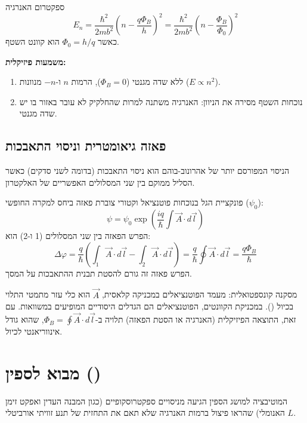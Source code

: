 \begin{resultbox}{ספקטרום האנרגיה}
\begin{equation}
E_n = \frac{\hbar^2}{2m b^2} \left( n - \frac{q\Phi_B}{h} \right)^2 = \frac{\hbar^2}{2m b^2} \left( n - \frac{\Phi_B}{\Phi_0} \right)^2
\end{equation}
כאשר $\Phi_0 = h/q$ הוא קוונט השטף.
\end{resultbox}

\textbf{משמעות פיזיקלית:}
\begin{enumerate}
    \item ללא שדה מגנטי ($\Phi_B=0$), הרמות $n$ ו-$-n$ מנוונות ($E \propto n^2$).
    \item נוכחות השטף מסירה את הניוון: האנרגיה משתנה למרות שהחלקיק לא עובר באזור בו יש שדה מגנטי.
\end{enumerate}

\subsection{פאזה גיאומטרית וניסוי התאבכות}
הניסוי המפורסם יותר של אהרונוב-בוהם הוא ניסוי התאבכות (בדומה לשני סדקים) כאשר הסליל ממוקם בין שני המסלולים האפשריים של האלקטרון.

פונקציית הגל בנוכחות פוטנציאל וקטורי צוברת פאזה ביחס למקרה החופשי ($\psi_0$):
\[
\psi = \psi_0 \exp\left( \frac{iq}{\hbar} \int \vec{A} \cdot d\vec{l} \right)
\]
הפרש הפאזה בין שני המסלולים (1 ו-2) הוא:
\begin{equation}
\Delta \varphi = \frac{q}{\hbar} \left( \int_1 \vec{A}\cdot d\vec{l} - \int_2 \vec{A}\cdot d\vec{l} \right) = \frac{q}{\hbar} \oint \vec{A} \cdot d\vec{l} = \frac{q\Phi_B}{\hbar}
\end{equation}
הפרש פאזה זה גורם להסטת תבנית ההתאבכות על המסך.

\begin{theorembox}{מסקנה קונספטואלית: מעמד הפוטנציאלים}
במכניקה קלאסית, $\vec{A}$ הוא כלי עזר מתמטי התלוי בכיול (). במכניקת הקוונטים, הפוטנציאלים הם הגדלים היסודיים המופיעים במשוואות.
עם זאת, התוצאה הפיזיקלית (האנרגיה או הסטת הפאזה) תלויה ב-$\Phi_B = \oint \vec{A} \cdot d\vec{l}$, שהוא גודל אינווריאנטי לכיול.
\end{theorembox}

\section{מבוא לספין ()}

המוטיבציה למושג הספין הגיעה מניסויים ספקטרוסקופיים (כגון המבנה העדין ואפקט זימן האנומלי) שהראו פיצול ברמות האנרגיה שלא תאם את התחזית של תנע זוויתי אורביטלי $L$.

